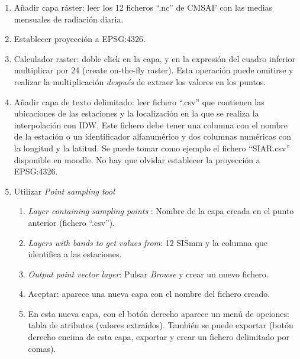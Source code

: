 \documentclass[11pt]{article}
\begin{document}
\begin{enumerate}
\item Añadir capa ráster: leer los 12 ficheros ``.nc'' de CMSAF con
  las medias mensuales de radiación diaria.
\item Establecer proyección a EPSG:4326.
\item Calculador raster: doble click en la capa, y en la expresión del
  cuadro inferior multiplicar por 24 (create on-the-fly raster). Esta
  operación puede omitirse y realizar la multiplicación \emph{después}
  de extraer los valores en los puntos.
\item Añadir capa de texto delimitado: leer fichero ``.csv'' que
  contienen las ubicaciones de las estaciones y la localización en la
  que se realiza la interpolación con IDW. Este fichero debe tener una
  columna con el nombre de la estación o un identificador alfanumérico
  y dos columnas numéricas con la longitud y la latitud. Se puede
  tomar como ejemplo el fichero ``SIAR.csv'' disponible en moodle. No
  hay que olvidar establecer la proyección a EPSG:4326.
\item Utilizar \emph{Point sampling tool}
  \begin{enumerate}
  \item \emph{Layer containing sampling points} : Nombre de la capa
    creada en el punto anterior (fichero ``.csv'').
  \item \emph{Layers with bands to get values from}: 12 SISmm y la
    columna que identifica a las estaciones.
  \item \emph{Output point vector layer}: Pulsar \emph{Browse} y crear
    un nuevo fichero.
  \item Aceptar: aparece una nueva capa con el nombre del fichero
    creado.
  \item En esta nueva capa, con el botón derecho aparece un menú de
    opciones: tabla de atributos (valores extraídos). También se puede
    exportar (botón derecho encima de esta capa, exportar y crear un
    fichero delimitado por comas).
  \end{enumerate}
\end{enumerate}
\end{document}
